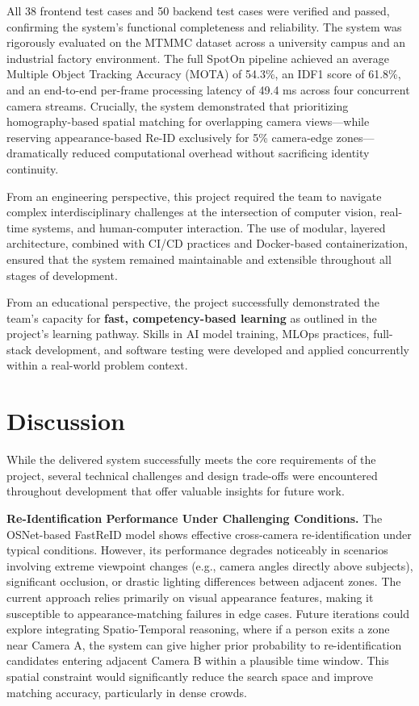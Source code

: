 All 38 frontend test cases and 50 backend test cases were verified and passed, confirming the system's functional completeness and reliability. The system was rigorously evaluated on the MTMMC dataset across a university campus and an industrial factory environment. The full SpotOn pipeline achieved an average Multiple Object Tracking Accuracy (MOTA) of 54.3\%, an IDF1 score of 61.8\%, and an end-to-end per-frame processing latency of 49.4 ms across four concurrent camera streams. Crucially, the system demonstrated that prioritizing homography-based spatial matching for overlapping camera views---while reserving appearance-based Re-ID exclusively for 5\% camera-edge zones---dramatically reduced computational overhead without sacrificing identity continuity.

From an engineering perspective, this project required the team to navigate complex interdisciplinary challenges at the intersection of computer vision, real-time systems, and human-computer interaction. The use of modular, layered architecture, combined with CI/CD practices and Docker-based containerization, ensured that the system remained maintainable and extensible throughout all stages of development.

From an educational perspective, the project successfully demonstrated the team's capacity for \textbf{fast, competency-based learning} as outlined in the project's learning pathway. Skills in AI model training, MLOps practices, full-stack development, and software testing were developed and applied concurrently within a real-world problem context.

\section{Discussion}
\label{section:discussion}

While the delivered system successfully meets the core requirements of the project, several technical challenges and design trade-offs were encountered throughout development that offer valuable insights for future work.

\textbf{Re-Identification Performance Under Challenging Conditions.}
The OSNet-based FastReID model shows effective cross-camera re-identification under typical conditions. However, its performance degrades noticeably in scenarios involving extreme viewpoint changes (e.g., camera angles directly above subjects), significant occlusion, or drastic lighting differences between adjacent zones. The current approach relies primarily on visual appearance features, making it susceptible to appearance-matching failures in edge cases. Future iterations could explore integrating Spatio-Temporal reasoning, where if a person exits a zone near Camera A, the system can give higher prior probability to re-identification candidates entering adjacent Camera B within a plausible time window. This spatial constraint would significantly reduce the search space and improve matching accuracy, particularly in dense crowds.


